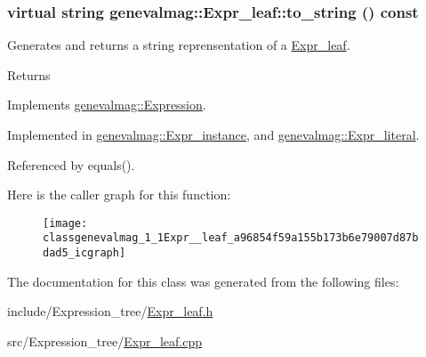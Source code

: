 \hypertarget{classgenevalmag_1_1Expr__leaf_a96854f59a155b173b6e79007d87bdad5}{
\subsubsection[{to\_\-string}]{\setlength{\rightskip}{0pt plus 5cm}virtual string genevalmag::Expr\_\-leaf::to\_\-string () const}}
\label{classgenevalmag_1_1Expr__leaf_a96854f59a155b173b6e79007d87bdad5}
Generates and returns a string reprensentation of a \hyperlink{classgenevalmag_1_1Expr__leaf}{Expr\_\-leaf}. \begin{DoxyReturn}{Returns}

\end{DoxyReturn}


Implements \hyperlink{classgenevalmag_1_1Expression_a8685f44429501da942b1fe76880af6fe}{genevalmag::Expression}.



Implemented in \hyperlink{classgenevalmag_1_1Expr__instance_a2186bb2f69173f709cfb75435b32da94}{genevalmag::Expr\_\-instance}, and \hyperlink{classgenevalmag_1_1Expr__literal_a2e023f432f0a46b75f65cb0e36ac6583}{genevalmag::Expr\_\-literal}.



Referenced by equals().



Here is the caller graph for this function:\nopagebreak
\begin{figure}[H]
\begin{center}
\leavevmode
\texttt{[image: classgenevalmag\_1\_1Expr\_\_leaf\_a96854f59a155b173b6e79007d87bdad5\_icgraph]}
\end{center}
\end{figure}




The documentation for this class was generated from the following files:\begin{DoxyCompactItemize}
\item 
include/Expression\_\-tree/\hyperlink{Expr__leaf_8h}{Expr\_\-leaf.h}\item 
src/Expression\_\-tree/\hyperlink{Expr__leaf_8cpp}{Expr\_\-leaf.cpp}\end{DoxyCompactItemize}
